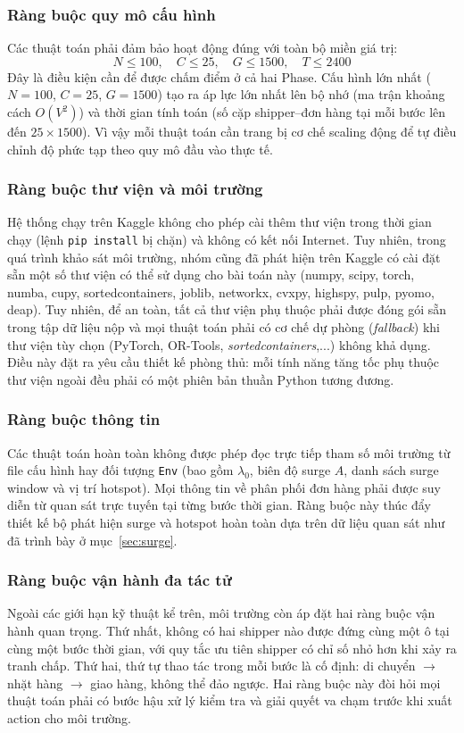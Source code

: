\documentclass[conference]{IEEEtran}
\begin{document}
\subsubsection{Ràng buộc quy mô cấu hình}
Các thuật toán phải đảm bảo hoạt động đúng với toàn bộ miền giá trị:
\begin{equation}
N \le 100,\quad C \le 25,\quad G \le 1500,\quad T \le 2400
\end{equation}
Đây là điều kiện cần để được chấm điểm ở cả hai Phase. Cấu hình lớn nhất ($N=100$, $C=25$, $G=1500$) tạo ra áp lực lớn nhất lên bộ nhớ (ma trận khoảng cách $O(V^2)$) và thời gian tính toán (số cặp shipper--đơn hàng tại mỗi bước lên đến $25 \times 1500$). Vì vậy mỗi thuật toán cần trang bị cơ chế scaling động để tự điều chỉnh độ phức tạp theo quy mô đầu vào thực tế.
 
\subsubsection{Ràng buộc thư viện và môi trường}
Hệ thống chạy trên Kaggle không cho phép cài thêm thư viện trong thời gian chạy (lệnh \texttt{pip install} bị chặn) và không có kết nối Internet. Tuy nhiên, trong quá trình khảo sát môi trường, nhóm cũng đã phát hiện trên Kaggle có cài đặt sẵn một số thư viện có thể sử dụng cho bài toán này (numpy, scipy, torch, numba, cupy, sortedcontainers, joblib, networkx, cvxpy, highspy, pulp, pyomo, deap). Tuy nhiên, để an toàn, tất cả thư viện phụ thuộc phải được đóng gói sẵn trong tập dữ liệu nộp và mọi thuật toán phải có cơ chế dự phòng (\textit{fallback}) khi thư viện tùy chọn (PyTorch, OR-Tools, \textit{sortedcontainers},...) không khả dụng. Điều này đặt ra yêu cầu thiết kế phòng thủ: mỗi tính năng tăng tốc phụ thuộc thư viện ngoài đều phải có một phiên bản thuần Python tương đương.
 
\subsubsection{Ràng buộc thông tin}
Các thuật toán hoàn toàn không được phép đọc trực tiếp tham số môi trường từ file cấu hình hay đối tượng \texttt{Env} (bao gồm $\lambda_0$, biên độ surge $A$, danh sách surge window và vị trí hotspot). Mọi thông tin về phân phối đơn hàng phải được suy diễn từ quan sát trực tuyến tại từng bước thời gian. Ràng buộc này thúc đẩy thiết kế bộ phát hiện surge và hotspot hoàn toàn dựa trên dữ liệu quan sát như đã trình bày ở mục~\ref{sec:surge}.
 
\subsubsection{Ràng buộc vận hành đa tác tử}
Ngoài các giới hạn kỹ thuật kể trên, môi trường còn áp đặt hai ràng buộc vận hành quan trọng. Thứ nhất, không có hai shipper nào được đứng cùng một ô tại cùng một bước thời gian, với quy tắc ưu tiên shipper có chỉ số nhỏ hơn khi xảy ra tranh chấp. Thứ hai, thứ tự thao tác trong mỗi bước là cố định: di chuyển $\to$ nhặt hàng $\to$ giao hàng, không thể đảo ngược. Hai ràng buộc này đòi hỏi mọi thuật toán phải có bước hậu xử lý kiểm tra và giải quyết va chạm trước khi xuất action cho môi trường.
 
\end{document}
